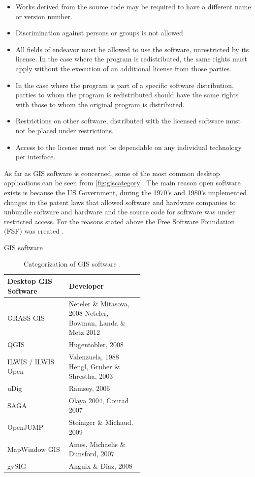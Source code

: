 \begin{itemize}
\item Works derived from the source code may be required to have a different name or version number.
\item Discrimination against persons or groups is not allowed
\item All fields of endeavor must be allowed to use the software, unrestricted by its license. In the case where the program is redistributed, the same rights must apply without the execution of an additional license from those parties.
\item In the case where the program is part of a specific software distribution, parties to whom the program is redistributed should have the same rights with those to  whom the original program is distributed.
\item Restrictions on other software, distributed with the licensed software must not be placed under restrictions.
\item Access to the license must not be dependable on any individual technology per interface.
\end{itemize}

As far as GIS software is concerned, some of the most common desktop applications can be seen from \autoref{fig:giscategory}.
The main reason open software exists is because the US Government, during the 1970's and 1980's implemented changes in the patent laws that allowed software and hardware companies to unbundle software and hardware and the source code for software was under restricted access. For the reasons stated above the Free Software Foundation (FSF) was created \citep{osbookde}.

\begin{table}[H]
\caption{GIS software}
\begin{tabular}{ l | p{0.55\linewidth} }
Desktop GIS Software & Developer \\ 
\hline
GRASS GIS & Neteler \& Mitasova, 2008 \newline
Neteler, Bowman, Landa \& Metz 2012 \\ 
\hline
QGIS & Hugentobler, 2008 \\ 
\hline
ILWIS / ILWIS Open & Valenzuela, 1988 \newline
Hengl, Gruber \& Shrestha, 2003 \\ 
\hline
uDig & Ramsey, 2006 \\ 
\hline
SAGA & Olaya 2004, Conrad 2007  \\ 
\hline
OpenJUMP & Steiniger \& Michaud, 2009 \\ 
\hline
MapWindow GIS & Ames, Michaelis \& Dunsford, 2007 \\ 
\hline
gvSIG & Anguix \& Diaz, 2008 \\ 
\hline
\end{tabular}
\caption*{Categorization of GIS software \citep{osarticle}.}
\label{tab:gissoftware}
\end{table}

